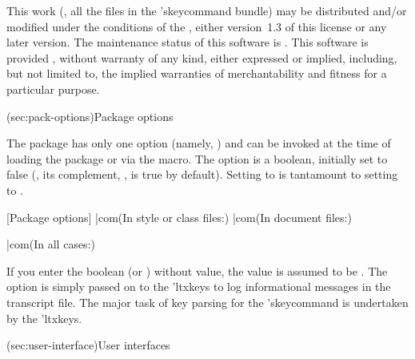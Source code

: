 \documentclass[
  use-a4-paper,
  use-10pt-font,
  final-version,
  use-UK-English,
  fancy-section-headings,
  frame-section-numbers,
  input-config-file,
  no-hyperref-messages,
  fancy-footers
]{amltxdoc}
\begin{document}
\begin{frontmatter}
\newletcs\licname\licensename
\renewdef*\licensename{\vspace{-\baselineskip}}
\begin{license}
\begin{frameshade}[width=\hsize,fillcolor=white,framesep=2pt,framerule=2pt,
  framecolor=brown]%
  \small
  \vspace{1ex}\centerline{\licname}\endgraff
  This work (\ie, all the files in the \pkgg'{skeycommand} bundle) may be distributed and/or modified under the conditions of the \lppl, either version~1.3 of this license or any later version.
  \endgraff
  The \lppl maintenance status of this software is . This software is provided , without warranty of any kind, either expressed or implied, including, but not limited to, the implied warranties of merchantability and fitness for a particular purpose.
  \endgraff
  \centerline{\makered{\CopyrightYear}}%
\end{frameshade}
\end{license}

\end{frontmatter}

\frameshade[fillcolor=yellow!20,framecolor=brown,framerule=2pt,framesep=2pt,
  width=\hsize]\tableofcontents
\endframeshade


\docsection(sec:pack-options){Package options}

The package has only one option (namely, ) and can be invoked at the time of loading the package or via the \fx{\skeycommand} macro. The option  is a boolean, initially set to false (\ie, its complement, , is true by default). Setting  to  is tantamount to setting  to .

[Package options]
|com(In style or class files:)
\RequirePackage[verbose=true |orr false]{skeycommand}
|com(In document files:)
\usepackage[verbose=true |orr false]{skeycommand}
|com(In all cases:)

If you enter the boolean   (or ) without value, the value is assumed to be . The  option is simply passed on to the \pkg'{ltxkeys} to log informational messages in the transcript file. The major task of key parsing for the \pkg'{skeycommand} is undertaken by the \pkg'{ltxkeys}.


\docsection(sec:user-interface){User interfaces}
\end{document}

